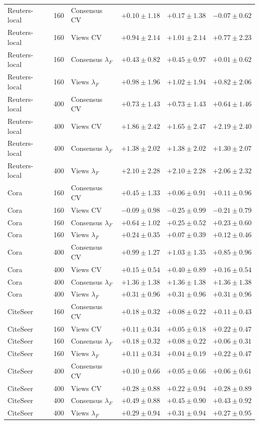 \begin{longtable}{lrlrrr}
Reuters-local & 160 & Consensus CV & $+0.10\pm1.18$ & $+0.17\pm1.38$ & $-0.07\pm0.62$\\
Reuters-local & 160 & Views CV & $+0.94\pm2.14$ & $+1.01\pm2.14$ & $+0.77\pm2.23$\\
Reuters-local & 160 & Consensus $\lambda_F$ & $+0.43\pm0.82$ & $+0.45\pm0.97$ & $+0.01\pm0.62$\\
Reuters-local & 160 & Views $\lambda_F$ & $+0.98\pm1.96$ & $+1.02\pm1.94$ & $+0.82\pm2.06$\\
Reuters-local & 400 & Consensus CV & $+0.73\pm1.43$ & $+0.73\pm1.43$ & $+0.64\pm1.46$\\
Reuters-local & 400 & Views CV & $+1.86\pm2.42$ & $+1.65\pm2.47$ & $+2.19\pm2.40$\\
Reuters-local & 400 & Consensus $\lambda_F$ & $+1.38\pm2.02$ & $+1.38\pm2.02$ & $+1.30\pm2.07$\\
Reuters-local & 400 & Views $\lambda_F$ & $+2.10\pm2.28$ & $+2.10\pm2.28$ & $+2.06\pm2.32$\\
Cora & 160 & Consensus CV & $+0.45\pm1.33$ & $+0.06\pm0.91$ & $+0.11\pm0.96$\\
Cora & 160 & Views CV & $-0.09\pm0.98$ & $-0.25\pm0.99$ & $-0.21\pm0.79$\\
Cora & 160 & Consensus $\lambda_F$ & $+0.64\pm1.02$ & $+0.25\pm0.52$ & $+0.23\pm0.60$\\
Cora & 160 & Views $\lambda_F$ & $+0.24\pm0.35$ & $+0.07\pm0.39$ & $+0.12\pm0.46$\\
Cora & 400 & Consensus CV & $+0.99\pm1.27$ & $+1.03\pm1.35$ & $+0.85\pm0.96$\\
Cora & 400 & Views CV & $+0.15\pm0.54$ & $+0.40\pm0.89$ & $+0.16\pm0.54$\\
Cora & 400 & Consensus $\lambda_F$ & $+1.36\pm1.38$ & $+1.36\pm1.38$ & $+1.36\pm1.38$\\
Cora & 400 & Views $\lambda_F$ & $+0.31\pm0.96$ & $+0.31\pm0.96$ & $+0.31\pm0.96$\\
CiteSeer & 160 & Consensus CV & $+0.18\pm0.32$ & $+0.08\pm0.22$ & $+0.11\pm0.43$\\
CiteSeer & 160 & Views CV & $+0.11\pm0.34$ & $+0.05\pm0.18$ & $+0.22\pm0.47$\\
CiteSeer & 160 & Consensus $\lambda_F$ & $+0.18\pm0.32$ & $+0.08\pm0.22$ & $+0.06\pm0.31$\\
CiteSeer & 160 & Views $\lambda_F$ & $+0.11\pm0.34$ & $+0.04\pm0.19$ & $+0.22\pm0.47$\\
CiteSeer & 400 & Consensus CV & $+0.10\pm0.66$ & $+0.05\pm0.66$ & $+0.06\pm0.61$\\
CiteSeer & 400 & Views CV & $+0.28\pm0.88$ & $+0.22\pm0.94$ & $+0.28\pm0.89$\\
CiteSeer & 400 & Consensus $\lambda_F$ & $+0.49\pm0.88$ & $+0.45\pm0.90$ & $+0.43\pm0.92$\\
CiteSeer & 400 & Views $\lambda_F$ & $+0.29\pm0.94$ & $+0.31\pm0.94$ & $+0.27\pm0.95$\\
\end{longtable}
\endgroup
